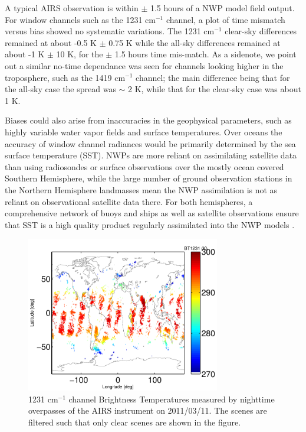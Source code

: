 \documentclass[agupp]{aguplus}              %
\newcommand{\wn}{cm$^{-1}$\xspace}
\begin{document}
\begin{article}
A typical AIRS observation is within $\pm$ 1.5 hours of a NWP model
field output. For window channels such as the 1231 \wn channel, a plot
of time mismatch versus bias showed no systematic variations. The 1231
\wn clear-sky differences remained at about -0.5 K $\pm$ 0.75 K while the
all-sky differences remained at about -1 K $\pm$ 10 K, for the $\pm$ 1.5 hours
time mis-match. As a sidenote, we point out a similar no-time
dependance was seen for channels looking higher in the troposphere,
such as the 1419 \wn channel; the main difference being that for the
all-sky case the spread was $\sim$ 2 K, while that for the clear-sky
case was about 1 K.

Biases could also arise from inaccuracies in the geophysical parameters, such
as highly variable water vapor fields and surface temperatures. Over
oceans the accuracy of window channel radiances would be primarily
determined by the sea surface temperature (SST). NWPs are more reliant
on assimilating satellite data than using radiosondes or surface
observations over the mostly ocean covered Southern Hemisphere, while
the large number of ground observation stations in the Northern
Hemisphere landmasses mean the NWP assimilation is not as reliant on
observational satellite data there. For both hemispheres, a
comprehensive network of buoys and ships as well as satellite
observations ensure that SST is a high quality product regularly
assimilated into the NWP models \citep{rey:02}.

\begin{figure}[h]
\noindent\includegraphics[width=20pc]{FIGS/ecm_clearBT1231v2.pdf}
\caption{1231 \wn channel Brightness Temperatures measured by nighttime overpasses of the
AIRS instrument on 2011/03/11. The scenes are filtered such that only clear scenes are shown 
in the figure.}
\label{bt1231_clear_obs}
\end{figure}


\end{article}
\end{document}
